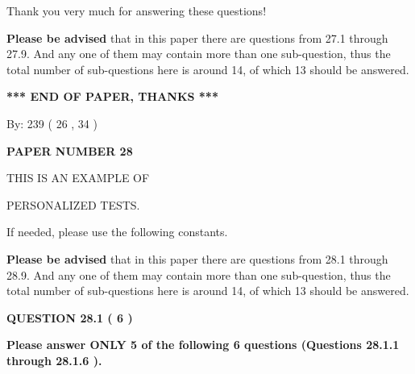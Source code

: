 \documentclass[12pt]{article}
\begin{document}
 
 
 
Thank you very much for answering these questions!
 
{\textbf{\large{Please be advised}}} that in this paper there are questions from
27.1 through
27.9.
And any one of them may contain more than one sub-question, thus the total number
of sub-questions here is around 14, of which
13 should be answered.
 
   
   
   
   
\vspace{1.0in} 
{\textbf{\large{ *** END OF PAPER, THANKS *** }}} 
   
   
\hspace{1.0in} By: 
         239 (          26 ,           34 )
   
   
   
   
\newpage 
\setcounter{page}{ 
    28001 } 
   
   
   
   
 {\textbf{ \Large{ PAPER NUMBER           28  }}}
   
   
\vspace{0.2in}
   
   
   
   
   
   
 \vspace{0.2in}
 
 
{\Huge  THIS IS AN EXAMPLE OF}
 
{\Huge  PERSONALIZED TESTS. }
 
If needed, please use the following constants.
 
 
 
{\textbf{\large{Please be advised}}} that in this paper there are questions from
28.1 through
28.9.
And any one of them may contain more than one sub-question, thus the total number
of sub-questions here is around 14, of which
13 should be answered.
 
\vspace{0.3in}
 
 
   
   
  
\vspace{0.2in}
  
{\textbf{\Large{QUESTION
28.1 
 (           6 )
}}}
  
  
{\textbf{\Large{Please answer ONLY  %
           5  %
 of the following  %
           6  %
 questions (Questions  %
28.1.1 %
 through  %
28.1.6 %
 ). }}}
   
\end{document}
